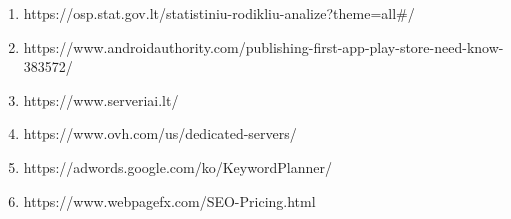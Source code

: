 \documentclass{VUMIFPSkursinis}
\begin{document}
		\begin{enumerate}
			\item https://osp.stat.gov.lt/statistiniu-rodikliu-analize?theme=all\#/
			\item https://www.androidauthority.com/publishing-first-app-play-store-need-know-383572/
			\item https://www.serveriai.lt/
			\item https://www.ovh.com/us/dedicated-servers/
			\item https://adwords.google.com/ko/KeywordPlanner/
			\item https://www.webpagefx.com/SEO-Pricing.html
		\end{enumerate}
\end{document}
